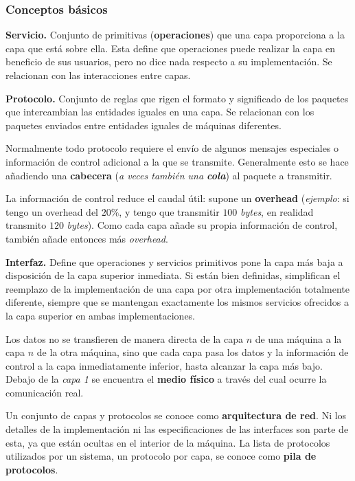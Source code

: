 \documentclass[10pt,a4paper]{article}
\begin{document}
\subsubsection{Conceptos básicos}
\begin{description}
\item \textbf{Servicio.} Conjunto de primitivas (\textbf{operaciones}) que una capa proporciona a la capa que está sobre ella. Esta define que operaciones puede realizar la capa en beneficio de sus usuarios, pero no dice nada respecto a su implementación. Se relacionan con las interacciones entre capas.
\item \textbf{Protocolo.} Conjunto de reglas que rigen el formato y significado de los paquetes que intercambian las entidades iguales en una capa. Se relacionan con los paquetes enviados entre entidades iguales de máquinas diferentes.

Normalmente todo protocolo requiere el envío de algunos mensajes especiales o información de control adicional a la que se transmite. Generalmente esto se hace añadiendo una \textbf{cabecera} (\textit{a veces también una \textbf{cola}}) al paquete a transmitir.

La información de control reduce el caudal útil: supone un \textbf{overhead} (\textit{ejemplo}: si tengo un overhead del $20\%$, y tengo que transmitir $100$ \textit{bytes}, en realidad transmito $120$ \textit{bytes}). Como cada capa añade su propia información de control, también añade entonces más \textit{overhead}.

\item \textbf{Interfaz.} Define que operaciones y servicios primitivos pone la capa más baja a disposición de la capa superior inmediata. Si están bien definidas, simplifican el reemplazo de la implementación de una capa por otra implementación totalmente diferente, siempre que se mantengan exactamente los mismos servicios ofrecidos a la capa superior en ambas implementaciones.
\end{description}

Los datos no se transfieren de manera directa de la capa $n$ de una máquina a la capa $n$ de la otra máquina, sino que cada capa pasa los datos y la información de control a la capa inmediatamente inferior, hasta alcanzar la capa más bajo. Debajo de la \textit{capa 1} se encuentra el \textbf{medio físico} a través del cual ocurre la comunicación real.

Un conjunto de capas y protocolos se conoce como \textbf{arquitectura de red}. Ni los detalles de la implementación ni las especificaciones de las interfaces son parte de esta, ya que están ocultas en el interior de la máquina. La lista de protocolos utilizados por un sistema, un protocolo por capa, se conoce como \textbf{pila de protocolos}.
\end{document}
